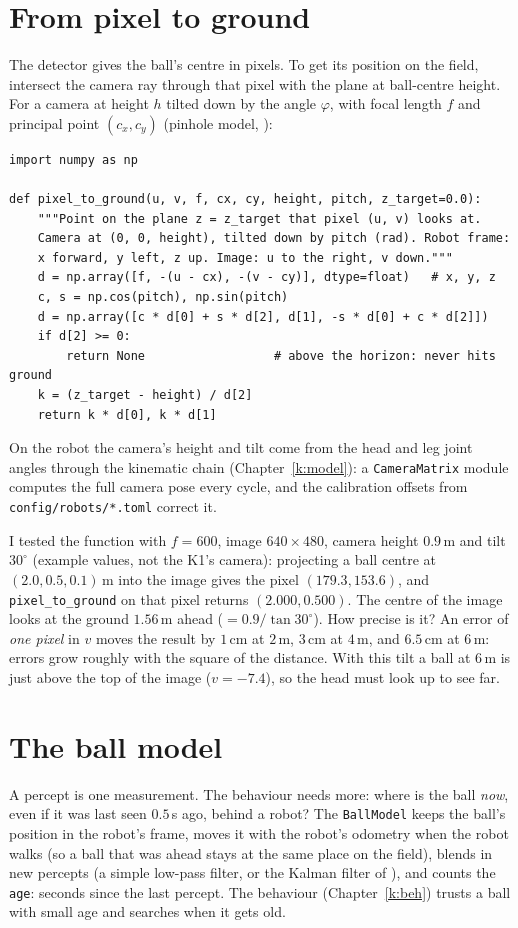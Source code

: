 \section*{From pixel to ground}
The detector gives the ball's centre in pixels. To get its position on the field, intersect the camera ray through that pixel with the plane at ball-centre height. For a camera at height $h$ tilted down by the angle $\varphi$, with focal length $f$ and principal point $(c_x,c_y)$ (pinhole model, ):
\begin{verbatim}
import numpy as np

def pixel_to_ground(u, v, f, cx, cy, height, pitch, z_target=0.0):
    """Point on the plane z = z_target that pixel (u, v) looks at.
    Camera at (0, 0, height), tilted down by pitch (rad). Robot frame:
    x forward, y left, z up. Image: u to the right, v down."""
    d = np.array([f, -(u - cx), -(v - cy)], dtype=float)   # x, y, z
    c, s = np.cos(pitch), np.sin(pitch)
    d = np.array([c * d[0] + s * d[2], d[1], -s * d[0] + c * d[2]])
    if d[2] >= 0:
        return None                  # above the horizon: never hits ground
    k = (z_target - height) / d[2]
    return k * d[0], k * d[1]
\end{verbatim}
On the robot the camera's height and tilt come from the head and leg joint angles through the kinematic chain (Chapter~\ref{k:model}): a \texttt{CameraMatrix} module computes the full camera pose every cycle, and the calibration offsets from \texttt{config/robots/*.toml} correct it.

I tested the function with $f=600$, image $640\times480$, camera height $0.9$\,m and tilt $30^\circ$ (example values, not the K1's camera\guess): projecting a ball centre at $(2.0,0.5,0.1)$\,m into the image gives the pixel $(179.3,153.6)$, and \verb!pixel_to_ground! on that pixel returns $(2.000,0.500)$. The centre of the image looks at the ground $1.56$\,m ahead ($=0.9/\tan30^\circ$). How precise is it? An error of \emph{one pixel} in $v$ moves the result by $1$\,cm at $2$\,m, $3$\,cm at $4$\,m, and $6.5$\,cm at $6$\,m: errors grow roughly with the square of the distance. With this tilt a ball at $6$\,m is just above the top of the image ($v=-7.4$), so the head must look up to see far.

\section*{The ball model}
A percept is one measurement. The behaviour needs more: where is the ball \emph{now}, even if it was last seen $0.5$\,s ago, behind a robot? The \texttt{BallModel} keeps the ball's position in the robot's frame, moves it with the robot's odometry when the robot walks (so a ball that was ahead stays at the same place on the field), blends in new percepts (a simple low-pass filter, or the Kalman filter of ), and counts the \texttt{age}: seconds since the last percept. The behaviour (Chapter~\ref{k:beh}) trusts a ball with small age and searches when it gets old.

